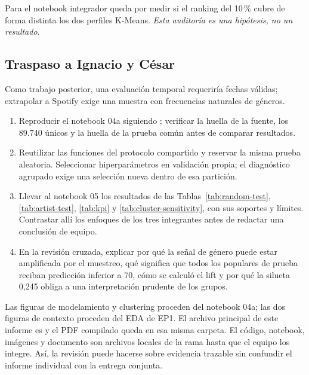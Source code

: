 Para el notebook integrador queda por medir si el ranking del 10\,\% cubre de
forma distinta los dos perfiles K-Means. \emph{Esta auditoría es una hipótesis,
no un resultado}.

\subsection{Traspaso a Ignacio y César}

Como trabajo posterior, una evaluación temporal requeriría fechas válidas;
extrapolar a Spotify exige una muestra con frecuencias naturales de géneros.

\begin{enumerate}
\item Reproducir el notebook 04a siguiendo ; verificar
la huella de la fuente, los 89.740  únicos y la huella de la
prueba común antes de comparar resultados.
\item Reutilizar las funciones del protocolo compartido y reservar la misma
prueba aleatoria. Seleccionar hiperparámetros en validación propia; el
diagnóstico agrupado exige una selección nueva dentro de esa partición.
\item Llevar al notebook 05 los resultados de las Tablas~\ref{tab:random-test},
\ref{tab:artist-test}, \ref{tab:kpi} y \ref{tab:cluster-sensitivity}, con sus
soportes y límites. Contrastar allí los enfoques de los tres integrantes antes
de redactar una conclusión de equipo.
\item En la revisión cruzada, explicar por qué la señal de género puede estar
amplificada por el muestreo, qué significa que todos los populares de prueba
reciban predicción inferior a 70, cómo se calculó el lift y por qué la silueta
0,245 obliga a una interpretación prudente de los grupos.
\end{enumerate}

Las figuras de modelamiento y clustering proceden del notebook 04a; las dos
figuras de contexto proceden del EDA de EP1. El archivo principal de este
informe es  y el PDF compilado queda en
esa misma carpeta. El código, notebook, imágenes y documento son archivos
locales de la rama  hasta que el equipo los
integre. Así, la revisión puede hacerse sobre evidencia trazable sin confundir
el informe individual con la entrega conjunta.
